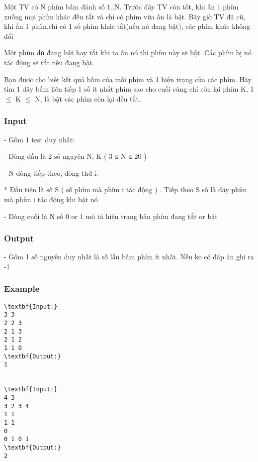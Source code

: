 



   Một TV có N phím bấm đánh số 1..N. Trước đây TV còn tốt, khi ấn 1 phím xuống mọi phím khác đều tắt và chỉ có phím vừa ấn là bật. Bây giờ TV đã cũ, khi ấn 1 phím,chỉ có 1 số phím khác tắt(nếu nó đang bật), các phím khác không đổi  

   Một phím dù đang bật hay tắt khi ta ấn nó thì phím này sẽ bật. Các phím bị nó tác động sẽ tắt nếu đang bật.  

   Bạn được cho biết kết quả bấm của mỗi phím và 1 hiện trạng của các phím. Hãy tìm 1 dãy bấm liên tiếp 1 số ít nhất phím sao cho cuối cùng chỉ còn lại phím K, 1  $\le$  K  $\le$  N, là bật các phím còn lại đều tắt.  

\subsubsection{   Input  }

   - Gồm 1 test duy nhất:  

   - Dòng đầu là 2 số nguyên N, K ( 3 ≤ N ≤ 20 )  

   - N dòng tiếp theo, dòng thứ i:  

   * Đầu tiên là số S ( số phím mà phím i tác động ) . Tiếp theo S số là dãy phím mà phím i tác động khi bật nó  

   - Dòng cuối là N số 0 or 1 mô tả hiện trạng bàn phím đang tắt or bật  

\subsubsection{   Output  }

   - Gồm 1 số nguyên duy nhất là số lần bấm phím ít nhất. Nếu ko có đáp án ghi ra -1  

\subsubsection{   Example  }
\begin{verbatim}
\textbf{Input:}
3 3
2 2 3
2 1 3
2 1 2
1 1 0
\textbf{Output:}
1


\textbf{Input:}
4 3
3 2 3 4
1 1
1 1
0
0 1 0 1
\textbf{Output:}
2

\end{verbatim}

